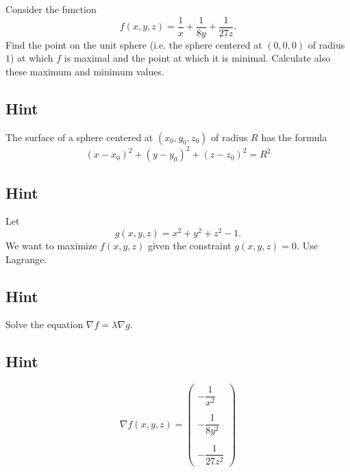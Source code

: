 \documentclass[a4paper,10pt]{article}
\begin{document}
Consider the function
\[
    f(x,y,z) = \frac{1}{x} + \frac{1}{8y} + \frac{1}{27z}.
\]
Find the point on the unit sphere (i.e. the sphere centered at $(0, 0, 0)$ of radius $1$) at which $f$ is maximal and the point at which it is minimal. Calculate also these maximum and minimum values.

\subsection{Hint}
The surface of a sphere centered at $(x_0, y_0, z_0)$ of radius $R$ has the formula
\[
    (x-x_0)^2 + (y-y_0)^2 + (z-z_0)^2 = R^2
\]

\subsection{Hint}
Let
\[
    g(x,y,z) = x^2 + y^2 + z^2 - 1.
\]
We want to maximize $f(x,y,z)$ given the constraint $g(x,y,z) = 0$. Use Lagrange.

\subsection{Hint}
Solve the equation $\nabla f = \lambda\nabla g$.

\subsection{Hint}
\[
    \nabla f(x,y,z) = \begin{pmatrix}
        -\dfrac{1}{x^2} \\ \\ -\dfrac{1}{8y^2} \\ \\ -\dfrac{1}{27z^2}
    \end{pmatrix}
\]
\end{document}
